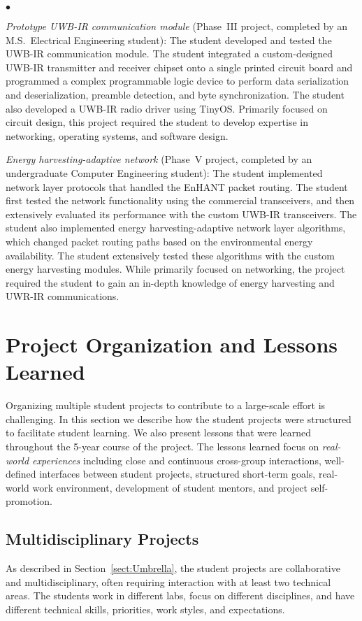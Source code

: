 \documentclass[journal,twopages]{IEEEtran}
\newenvironment{myitemize}{\begin{list}{$\bullet$}{\renewcommand{\leftmargin}{0.2in}}}{\end{list}}
\begin{document}
\begin{myitemize}
\item \emph{Prototype UWB-IR communication module} (Phase~III proj\-ect, completed by an  M.S.\ Electrical Engineering student):
    The student developed and tested the \mbox{UWB-IR} communication module. The student integrated a custom-designed \mbox{UWB-IR} transmitter and receiver chipset onto a single printed circuit board and programmed a complex programmable logic device     to perform data serialization and deserialization, preamble detection, and byte synchronization. The student also developed a UWB-IR radio driver using TinyOS. Primarily focused on circuit design, this project required the student to develop expertise in networking, operating systems, and software design.

\item \emph{Energy harvesting-adaptive network} (Phase~V proj\-ect, completed by an undergraduate Computer Engineering student): The student implemented network layer protocols that handled the EnHANT packet routing.
    The student first tested the network functionality using the commercial transceivers, and then
    extensively evaluated its performance with the custom \mbox{UWB-IR} transceivers.
    The student also implemented energy harvesting-adaptive network layer algorithms, which changed packet routing paths based on the environmental energy availability. The student extensively tested these algorithms with the custom energy harvesting modules.
    While primarily focused on networking, the project required the student to gain an in-depth knowledge of energy harvesting and \mbox{UWR-IR} communications.
\end{myitemize}

 
\section{Project Organization and Lessons Learned}
\label{sect:Approach}\label{sect:Lessons}
Organizing multiple student projects to contribute to a large-scale effort is challenging.
In this section we describe how the student projects were structured to facilitate student learning. We also present lessons that were learned throughout the \mbox{5-year} course of the project.
The lessons learned focus on \emph{real-world experiences} including close and continuous cross-group interactions, well-defined interfaces between student projects, structured short-term goals, real-world work environment, development of student mentors, and project self-promotion.

\subsection{Multidisciplinary Projects}
As described in Section~\ref{sect:Umbrella}, the student projects are collaborative and multidisciplinary, often requiring interaction with at least two technical areas. The students work in different labs, focus on different disciplines, and have different technical skills, priorities, work styles, and expectations.
\end{document}
